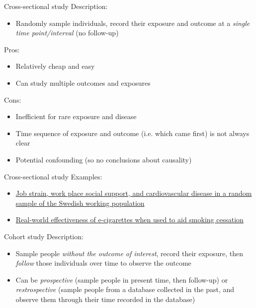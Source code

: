 \documentclass[10pt,t]{beamer}
\begin{document}
\begin{frame}{Cross-sectional study}
Description:
\begin{itemize}
	\item Randomly sample individuals, record their exposure and outcome at a \textit{single time point/interval} (no follow-up)
\end{itemize}
Pros:
\begin{itemize}
	\item Relatively cheap and easy
	\item Can study multiple outcomes and exposures
\end{itemize}
Cons:
\begin{itemize}
	\item Inefficient for rare exposure and disease 
	\item Time sequence of exposure and outcome (i.e. which came first) is not always clear
	\item Potential confounding (so no conclusions about causality)
\end{itemize}
\end{frame}

\begin{frame}[c]{Cross-sectional study}
Examples:
\vspace{0.3cm}

\begin{itemize}
	\item \href{http://ajph.aphapublications.org/doi/abs/10.2105/AJPH.78.10.1336}{\color{cyan} Job strain, work place social support, and cardiovascular disease in a random sample of the Swedish working population}
	\item \href{onlinelibrary.wiley.com/doi/10.1111/add.12623/full}{\color{cyan} Real-world effectiveness of e-cigarettes when used to aid smoking cessation}
\end{itemize}



\end{frame}

\begin{frame}{Cohort study}
Description:
\begin{itemize}
	\item Sample people \textit{without the outcome of interest}, record their exposure, then \textit{follow} those individuals over time to observe the outcome
	\item Can be \textit{prospective} (sample people in present time, then follow-up) or \textit{restrospective} (sample people from a database collected in the past, and observe them through their time recorded in the database)
\end{itemize}
\end{frame}
\end{document}
